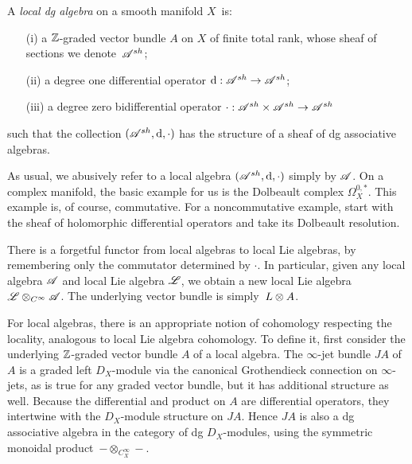 \begin{dfn}\label{def: localalg}
A {\em local dg algebra} on a smooth manifold $X$~is:
\begin{enumerate}
\item[(i)] a $\mathbb Z$-graded vector bundle $A$ on $X$ of finite total rank, whose sheaf of sections we denote~$\mathscr A^{sh}$;
\item[(ii)] a degree one differential operator ${\rm d} : \mathscr A^{sh} \to \mathscr A^{sh}$;
\item[(iii)] a degree zero bidifferential operator $\cdot : \mathscr A^{sh} \times \mathscr A^{sh} \to \mathscr A^{sh}$
\end{enumerate}
such that the collection $(\mathscr A^{sh}, {\rm d}, \cdot)$ has the structure of a sheaf of dg associative algebras.
\end{dfn}

As usual, we abusively refer to a local algebra $(\mathscr A^{sh}, {\rm d}, \cdot)$ simply by $\mathscr A$.
On a complex manifold, the basic example for us is the Dolbeault complex $\Omega^{0,*}_X$.
This example is, of course, commutative. 
For a noncommutative example, start with the sheaf of holomorphic differential operators and take its Dolbeault resolution. 

There is a forgetful functor from local algebras to local Lie algebras, by remembering only the commutator determined by $\cdot$. 
In particular, given any local algebra $\mathscr A$ and local Lie algebra $\mathscr L$, 
we obtain a new local Lie algebra $\mathscr L \otimes_{C^\infty} \mathscr A$.
The underlying vector bundle is simply~$L \otimes A$. 

For local algebras, there is an appropriate notion of cohomology respecting the locality, 
analogous to local Lie algebra cohomology. 
To define it, first consider the underlying $\mathbb Z$-graded vector bundle $A$ of a local algebra. 
The $\infty$-jet bundle $JA$ of $A$ is a graded left $D_X$-module via the canonical Grothendieck connection on $\infty$-jets,
as is true for any graded vector bundle,
but it has additional structure as well.
Because the differential and product on $A$ are differential operators, 
they intertwine with the $D_X$-module structure on $JA$.
Hence $JA$ is also a dg associative algebra in the category of dg $D_X$-modules,
using the symmetric monoidal product~$- \otimes_{C^\infty_X} -$. 

